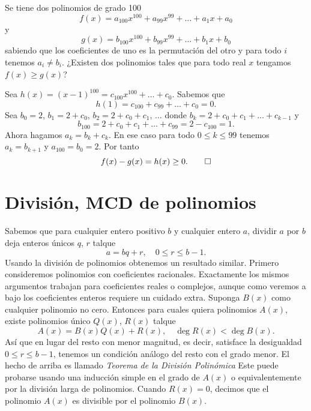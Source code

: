 \begin{example}
    Se tiene dos polinomios de grado 100
    \[
        f(x) = a_{100} x^{100} + a_{99} x^{99} + \ldots + a_1 x + a_0
    \]
    y
    \[
        g(x) = b_{100} x^{100} + b_{99} x^{99} + \ldots + b_1 x + b_0
    \]
    sabiendo que los coeficientes de uno es la permutación del otro y para todo $i$ tenemos $a_i \neq b_i$.
    ¿Existen dos polinomios tales que para todo real $x$ tengamos $f(x) \geq g(x)$?
\end{example}
\begin{solution}
    Sea $h(x) = (x - 1)^{100} = c_{100} x^{100} + \ldots + c_0$.
    Sabemos que
    \[
        h(1) = c_{100} + c_{99} + \ldots + c_0 = 0.
    \]
    Sea $b_0 = 2$, $b_1 = 2 + c_0$, $b_2 = 2 + c_0 + c_1$, $\ldots$ donde $b_k = 2 + c_0 + c_1 + \ldots + c_{k - 1}$ y
    \[
        b_{100} = 2 + c_0 + c_1 + \ldots + c_{99} = 2 - c_{100} = 1.
    \]
    Ahora hagamos $a_k = b_k + c_k$.
    En ese caso para todo $0 \leq k \leq 99$ tenemos $a_k = b_{k + 1}$ y $a_{100} = b_0 = 2$.
    Por tanto
    \[
        f(x) - g(x) = h(x) \geq 0. \qedhere
    \]
\end{solution}




\section{División, MCD de polinomios}

Sabemos que para cualquier entero positivo $b$ y cualquier entero $a$, dividir $a$ por $b$ deja enteros únicos $q$, $r$ talque
\[
    a = bq + r, \quad 0 \leq r \leq b - 1.
\]
Usando la división de polinomios obtenemos un resultado similar.
Primero consideremos polinomios con coeficientes racionales.
Exactamente los mismos argumentos trabajan para coeficientes reales o complejos, aunque como veremos a bajo los coeficientes enteros requiere un cuidado extra.
Suponga $B(x)$ como cualquier polinomio no cero.
Entonces para cuales quiera polinomios $A(x)$, existe polinomios único $Q(x)$, $R(x)$ talque
\[
    A(x) = B(x) Q(x) + R(x), \quad \deg{R(x)} < \deg{B(x)}.
\]
Así que en lugar del resto con menor magnitud, es decir, satisface la desigualdad $0 \leq r \leq b - 1$, tenemos un condición análogo del resto con el grado menor.
El hecho de arriba es llamado \textit{Teorema de la División Polinómica}
Este puede probarse usando una inducción simple en el grado de $A(x)$ o equivalentemente por la división larga de polinomios.
Cuando $R(x) = 0$, decimos que el polinomio $A(x)$ es divisible por el polinomio $B(x)$.

